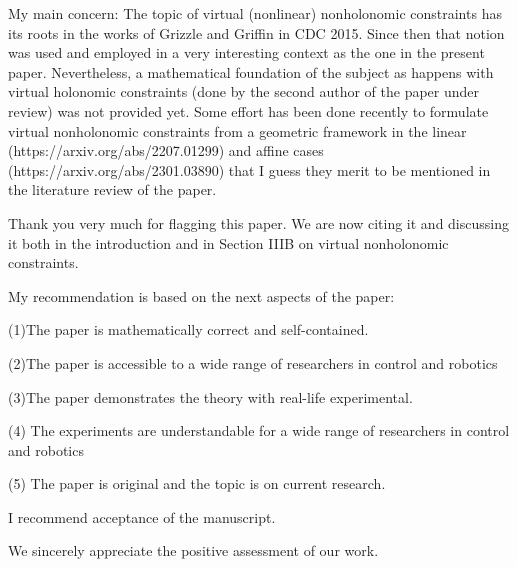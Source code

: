 \documentclass[11pt,letter]{article}
\newenvironment{myquote}{%
\bigskip%
\begin{tcolorbox}[]\footnotesize}{%
\end{tcolorbox}%
\bigskip}
\begin{document}
\begin{myquote}
My main concern: The topic of virtual (nonlinear) nonholonomic
constraints has its roots in the works of Grizzle and Griffin in CDC
2015. Since then that notion was used and employed in a very
interesting context as the one in the present paper. Nevertheless, a
mathematical foundation of the subject as happens with virtual
holonomic constraints (done by the second author of the paper under
review) was not provided yet. Some effort has been done recently to
formulate virtual nonholonomic constraints from a geometric framework
in the linear (https://arxiv.org/abs/2207.01299) and affine cases
(https://arxiv.org/abs/2301.03890) that I guess they merit to be
mentioned in the literature review of the paper.
\end{myquote}

Thank you very much for flagging this paper. We are now citing it and discussing it both in the introduction and in Section IIIB on virtual nonholonomic constraints.



\begin{myquote}
  My recommendation is based on the next aspects of the paper:

(1)The paper is mathematically correct and self-contained.

(2)The paper is accessible to a wide range of researchers in control
and robotics

(3)The paper demonstrates the theory with real-life experimental.

(4) The experiments are understandable for a wide range of researchers
in control and robotics

(5) The paper is original and the topic is on current research.

I recommend acceptance of the manuscript.
\end{myquote}


We sincerely appreciate the positive assessment of our work.
\end{document}
